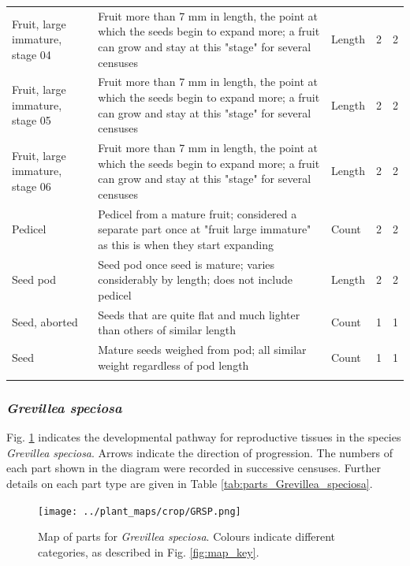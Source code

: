 \documentclass[10pt,twoside]{article}\usepackage[]{graphicx}\usepackage[]{color}
\begin{document}
\begin{longtable}{p{4.5cm}p{6cm}p{2cm}p{1cm}p{1cm}}
  Fruit, large immature, stage 04 & Fruit more than 7 mm in length, the point at which the seeds begin to expand more; a fruit can grow and stay at this "stage" for several censuses & Length & 2 &   2 \\ 
  Fruit, large immature, stage 05 & Fruit more than 7 mm in length, the point at which the seeds begin to expand more; a fruit can grow and stay at this "stage" for several censuses & Length & 2 &   2 \\ 
  Fruit, large immature, stage 06 & Fruit more than 7 mm in length, the point at which the seeds begin to expand more; a fruit can grow and stay at this "stage" for several censuses & Length & 2 &   2 \\ 
  Pedicel & Pedicel from a mature fruit; considered a separate part once at "fruit large immature" as this is when they start expanding & Count & 2 &   2 \\ 
  Seed pod & Seed pod once seed is mature; varies considerably by length; does not include pedicel & Length & 2 &   2 \\ 
  Seed, aborted & Seeds that are quite flat and much lighter than others of similar length & Count & 1 &   1 \\ 
  Seed & Mature seeds weighed from pod; all similar weight regardless of pod length & Count & 1 &   1 \\ 
   \hline
\hline
\label{tab:parts_Grevillea_buxifolia}
\end{longtable}
\endgroup



\clearpage

\subsubsection{\emph{Grevillea speciosa}}

Fig. \ref{fig:map_Grevillea_speciosa} indicates the developmental pathway for reproductive tissues in the species \emph{Grevillea speciosa}. Arrows indicate the direction of progression.  The numbers of each part shown in the diagram were recorded in successive censuses. Further details on each part type are given in Table \ref{tab:parts_Grevillea_speciosa}.

\begin{figure}[h]
\centering
\texttt{[image: ../plant\_maps/crop/GRSP.png]}
\caption{Map of parts for \emph{Grevillea speciosa}. Colours indicate different categories, as described in Fig. \ref{fig:map_key}.}
\label{fig:map_Grevillea_speciosa}
\end{figure}
\end{document}
